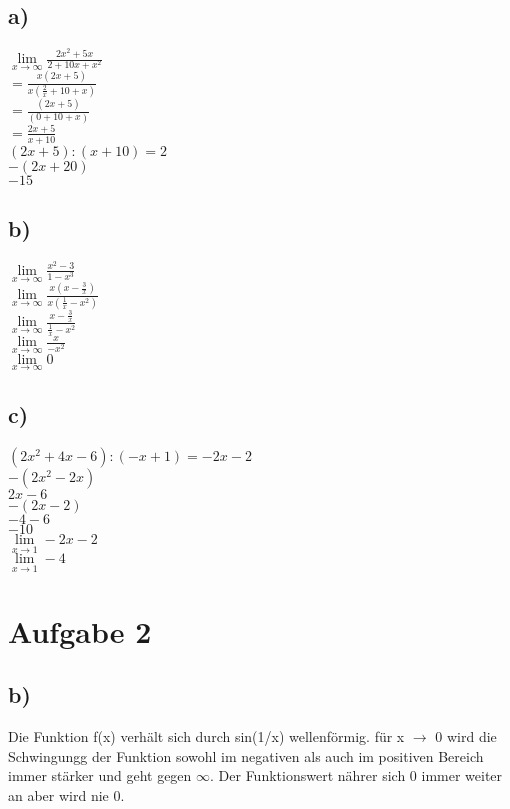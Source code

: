 \documentclass{article}
\begin{document}
	\subsection*{a)}
	$\lim\limits_{x\to \infty} \frac{2x^{2} + 5x}{2 + 10x + x^2}$ \\
	$ = \frac{x(2x + 5)}{x(\frac{2}{x} + 10 + x)}$ \\
	$ = \frac{(2x + 5)}{(0 + 10 + x)}$ \\
	$ = \frac{2x + 5}{x + 10}$ \\
	$(2x + 5) : (x + 10) = 2$ \\
	$-(2x + 20)$ \\
	$-15$
	\subsection*{b)}
	$\lim\limits_{x\to \infty} \frac{x^2 - 3}{1-x^3}$ \\
	$\lim\limits_{x\to \infty} \frac{x(x - \frac{3}{x})}{x(\frac{1}{x}-x^2)}$ \\
	$\lim\limits_{x\to \infty} \frac{x - \frac{3}{x}}{\frac{1}{x}-x^2}$ \\
	$\lim\limits_{x\to \infty} \frac{x}{-x^2}$ \\
	$\lim\limits_{x\to \infty} 0$ \\
	\subsection*{c)}
	$(2x^2 + 4x - 6) : (-x + 1) = -2x - 2$ \\
	$-(2x^2 -2x)$ \\
		$2x -6$ \\
		$-(2x -2)$ \\
			$-4 - 6$ \\
			$-10$ \\
	$\lim\limits_{x\to 1} -2x - 2$\\
	$\lim\limits_{x\to 1} -4$
	\section*{Aufgabe 2}
	\subsection*{b)}
	Die Funktion f(x) verhält sich durch sin(1/x) wellenförmig. für x $\to$ 0 wird die Schwingungg der Funktion sowohl im negativen als auch im positiven Bereich immer stärker und geht gegen $\infty$. Der Funktionswert nährer sich 0 immer weiter an aber wird nie 0. \\
\end{document}
